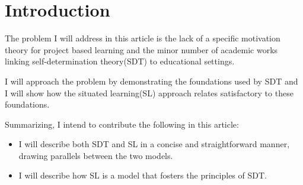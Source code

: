 \section{Introduction}

The problem I will address in this article is the lack of a specific motivation
theory for project based learning and the minor number of academic works linking
self-determination theory(SDT) to educational settings.

I will approach the problem by demonstrating the foundations used by SDT and I
will show how the situated learning(SL) approach relates satisfactory to these
foundations. 

Summarizing, I intend to contribute the following in this article:

\begin{itemize}
 
    \item I will describe both SDT and SL in a concise and
    straightforward manner, drawing parallels between the two models.

    \item I will describe how SL is a model that fosters the
    principles of SDT.

\end{itemize}

